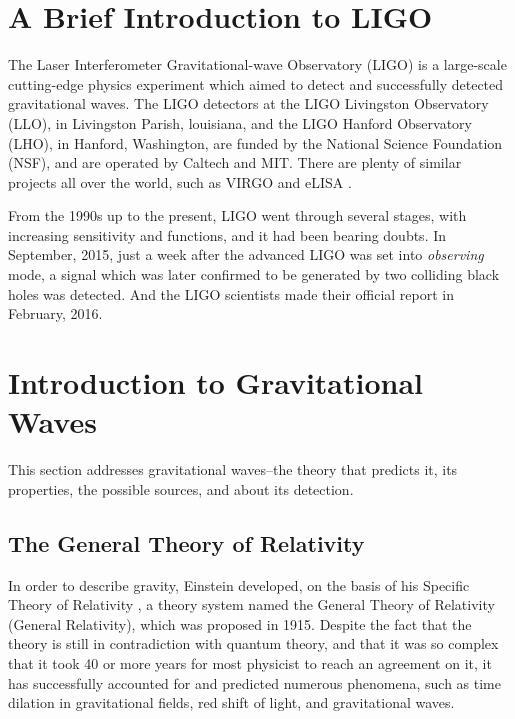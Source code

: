 \documentclass[aps,prl,preprint]{revtex4}
\begin{document}
\section{A Brief Introduction to LIGO \label{BI2LIGO}}
The Laser Interferometer Gravitational-wave Observatory (LIGO) is a large-scale cutting-edge physics experiment which aimed to detect and successfully detected gravitational waves. The LIGO detectors at the LIGO Livingston Observatory (LLO), in Livingston Parish, louisiana, and the LIGO Hanford Observatory (LHO), in Hanford, Washington, are funded by the National Science Foundation (NSF), and are operated by Caltech and MIT. There are plenty of similar projects all over the world, such as VIRGO \cite{Virgo} and eLISA \cite{eLISA}.

From the 1990s up to the present, LIGO went through several stages, with increasing sensitivity and functions, and it had been bearing doubts. In September, 2015, just a week after the advanced LIGO was set into \emph{observing} mode, a signal which was later confirmed to be generated by two colliding black holes was detected. \cite{GW} And the LIGO scientists made their official report in February, 2016. \cite{O1}


\section{Introduction to Gravitational Waves \label{intro2GW}}
This section addresses gravitational waves--the theory that predicts it, its properties, the possible sources, and about its detection.

\subsection{The General Theory of Relativity}
In order to describe gravity, Einstein developed, on the basis of his Specific Theory of Relativity \cite{spe.relativity}, a theory system named the General Theory of Relativity (General Relativity), which was proposed in 1915. \cite{relativity1} Despite the fact that the theory is still in contradiction with quantum theory, and that it was so complex that it took 40 or more years for most physicist to reach an agreement on it, it has successfully accounted for and predicted numerous phenomena, such as time dilation in gravitational fields, red shift of light, and gravitational waves.
\end{document}

